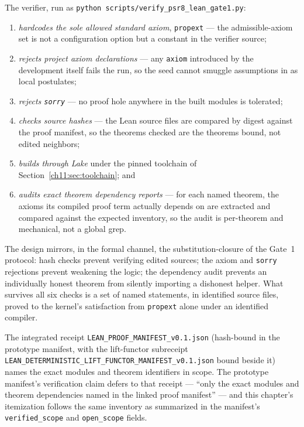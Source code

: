 \begin{protocol}\label{ch11:proto:lean}
The verifier, run as
\texttt{python scripts/verify\_psr8\_lean\_gate1.py}:
\begin{enumerate}
\item \emph{hardcodes the sole allowed standard axiom},
      \texttt{propext} --- the admissible-axiom set is not a
      configuration option but a constant in the verifier source;
\item \emph{rejects project axiom declarations} --- any
      \texttt{axiom} introduced by the development itself fails the run,
      so the seed cannot smuggle assumptions in as local postulates;
\item \emph{rejects \texttt{sorry}} --- no proof hole anywhere in the
      built modules is tolerated;
\item \emph{checks source hashes} --- the Lean source files are compared
      by digest against the proof manifest, so the theorems checked are
      the theorems bound, not edited neighbors;
\item \emph{builds through Lake} under the pinned toolchain of
      Section~\ref{ch11:sec:toolchain}; and
\item \emph{audits exact theorem dependency reports} --- for each named
      theorem, the axioms its compiled proof term actually depends on are
      extracted and compared against the expected inventory, so the audit
      is per-theorem and mechanical, not a global grep.
\end{enumerate}
\end{protocol}

The design mirrors, in the formal channel, the substitution-closure of the
Gate~1 protocol: hash checks prevent verifying edited sources; the axiom
and \texttt{sorry} rejections prevent weakening the logic; the dependency
audit prevents an individually honest theorem from silently importing a
dishonest helper. What survives all six checks is a set of named
statements, in identified source files, proved to the kernel's
satisfaction from \texttt{propext} alone under an identified compiler.

\begin{remark}\label{ch11:rem:receipt}
The integrated receipt \texttt{LEAN\_PROOF\_MANIFEST\_v0.1.json}
(hash-bound in the prototype manifest, with the lift-functor subreceipt
\texttt{LEAN\_DETERMINISTIC\_LIFT\_FUNCTOR\_MANIFEST\_v0.1.json} bound
beside it) names the exact modules and theorem identifiers in scope. The
prototype manifest's verification claim defers to that receipt ---
``only the exact modules and theorem dependencies named in the linked
proof manifest'' --- and this chapter's itemization follows the same
inventory as summarized in the manifest's \texttt{verified\_scope} and
\texttt{open\_scope} fields.
\end{remark}

